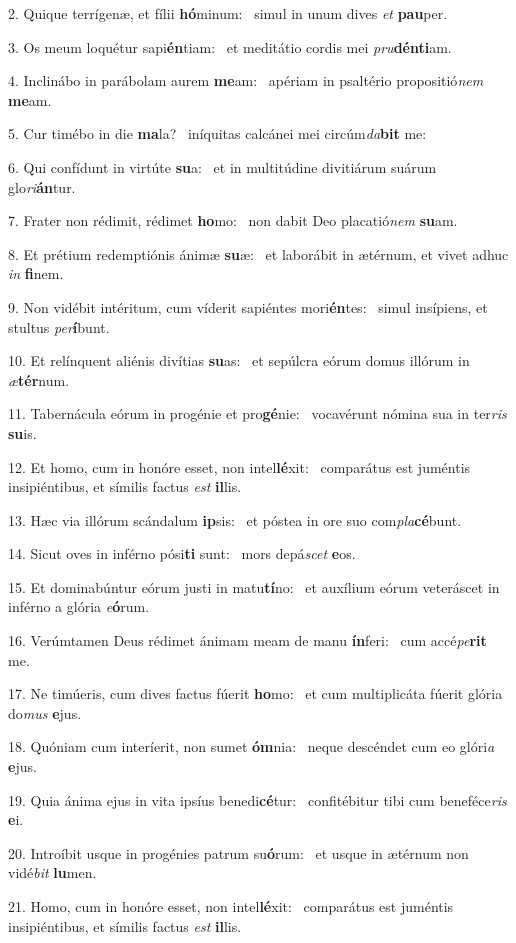 2. Quique terrígenæ, et fílii \textbf{hó}minum: \ast\  simul in unum dives \textit{et} \textbf{pau}per.\

3. Os meum loquétur sapi\textbf{én}tiam: \ast\  et meditátio cordis mei \textit{pru}\textbf{dén}\textbf{ti}am.\

4. Inclinábo in parábolam aurem \textbf{me}am: \ast\  apériam in psaltério propositió\textit{nem} \textbf{me}am.\

5. Cur timébo in die \textbf{ma}la? \ast\  iníquitas calcánei mei circúm\textit{da}\textbf{bit} me:\

6. Qui confídunt in virtúte \textbf{su}a: \ast\  et in multitúdine divitiárum suárum glo\textit{ri}\textbf{án}tur.\

7. Frater non rédimit, rédimet \textbf{ho}mo: \ast\  non dabit Deo placatió\textit{nem} \textbf{su}am.\

8. Et prétium redemptiónis ánimæ \textbf{su}æ: \ast\  et laborábit in ætérnum, et vivet adhuc \textit{in} \textbf{fi}nem.\

9. Non vidébit intéritum, cum víderit sapiéntes mori\textbf{én}tes: \ast\  simul insípiens, et stultus \textit{per}\textbf{í}bunt.\

10. Et relínquent aliénis divítias \textbf{su}as: \ast\  et sepúlcra eórum domus illórum in \textit{æ}\textbf{tér}num.\

11. Tabernácula eórum in progénie et pro\textbf{gé}nie: \ast\  vocavérunt nómina sua in ter\textit{ris} \textbf{su}is.\

12. Et homo, cum in honóre esset, non intel\textbf{lé}xit: \ast\  comparátus est juméntis insipiéntibus, et símilis factus \textit{est} \textbf{il}lis.\

13. Hæc via illórum scándalum \textbf{ip}sis: \ast\  et póstea in ore suo com\textit{pla}\textbf{cé}bunt.\

14. Sicut oves in inférno pósi\textbf{ti} sunt: \ast\  mors depá\textit{scet} \textbf{e}os.\

15. Et dominabúntur eórum justi in matu\textbf{tí}no: \ast\  et auxílium eórum veteráscet in inférno a glória \textit{e}\textbf{ó}rum.\

16. Verúmtamen Deus rédimet ánimam meam de manu \textbf{ín}feri: \ast\  cum accé\textit{pe}\textbf{rit} me.\

17. Ne timúeris, cum dives factus fúerit \textbf{ho}mo: \ast\  et cum multiplicáta fúerit glória do\textit{mus} \textbf{e}jus.\

18. Quóniam cum interíerit, non sumet \textbf{óm}nia: \ast\  neque descéndet cum eo glóri\textit{a} \textbf{e}jus.\

19. Quia ánima ejus in vita ipsíus benedi\textbf{cé}tur: \ast\  confitébitur tibi cum beneféce\textit{ris} \textbf{e}i.\

20. Introíbit usque in progénies patrum su\textbf{ó}rum: \ast\  et usque in ætérnum non vidé\textit{bit} \textbf{lu}men.\

21. Homo, cum in honóre esset, non intel\textbf{lé}xit: \ast\  comparátus est juméntis insipiéntibus, et símilis factus \textit{est} \textbf{il}lis.\

